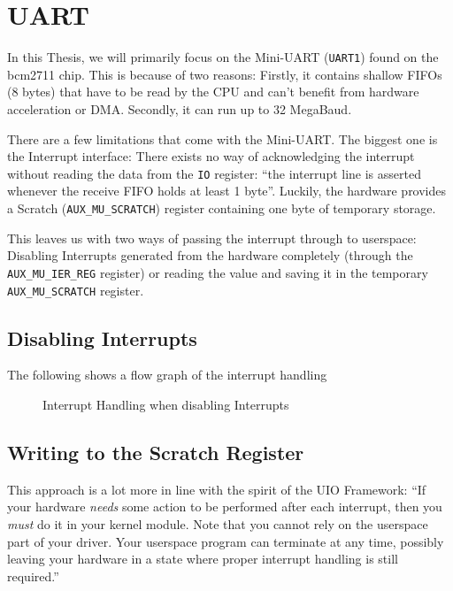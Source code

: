 \documentclass[../main.tex]{subfiles}
\begin{document}
    \clearpage  

    \section{UART}
    In this Thesis, we will primarily focus on the Mini-UART (\texttt{UART1}) found on the bcm2711 chip. This is because of two reasons: Firstly, it contains shallow FIFOs (8 bytes) that have to be read by the CPU and can't benefit from hardware acceleration or DMA. Secondly, it can run up to 32 MegaBaud.

    There are a few limitations that come with the Mini-UART. The biggest one is the \todo[abysmal] Interrupt interface: There exists no way of acknowledging the interrupt without reading the data from the \texttt{IO} register: \enquote{the interrupt line is asserted whenever the receive FIFO holds at least 1 byte}. Luckily, the hardware provides a Scratch (\texttt{AUX\_MU\_SCRATCH}) register containing one byte of temporary storage.

    This leaves us with two ways of passing the interrupt through to userspace: Disabling Interrupts generated from the hardware completely (through the \texttt{AUX\_MU\_IER\_REG} register) or reading the value and saving it in the temporary \texttt{AUX\_MU\_SCRATCH} register.

    \subsection{Disabling Interrupts}
    The following shows a flow graph of the interrupt handling
    \begin{figure}[H]
        \centering
        \caption{Interrupt Handling when disabling Interrupts}
        \label{fig:disable-interrupts}
    \end{figure}

    \subsection{Writing to the Scratch Register}
    This approach is a lot more in line with the spirit of the UIO Framework: 
    \enquote{If your hardware \textit{needs} some action to be performed after each interrupt, then you \textit{must} do it in your kernel module. Note that you cannot rely on the userspace part of your driver. Your userspace program can terminate at any time, possibly leaving your hardware in a state where proper interrupt handling is still required.}
\end{document}
